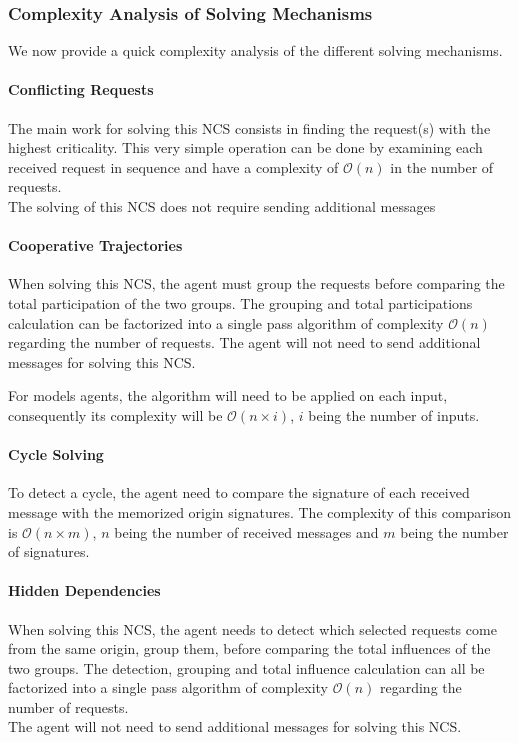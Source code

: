 \subsubsection*{Complexity Analysis of Solving Mechanisms}

We now provide a quick complexity analysis of the different solving mechanisms.

\paragraph*{Conflicting Requests}

The main work for solving this NCS consists in finding the request(s) with the highest criticality. This very simple operation can be done by examining each received request in sequence and have a complexity of $\mathcal{O}(n)$ in the number of requests.\\
The solving of this NCS does not require sending additional messages

\paragraph*{Cooperative Trajectories }

When solving this NCS, the agent must group the requests before comparing the total participation of the two groups. The grouping and total participations calculation can be factorized into a single pass algorithm of complexity $\mathcal{O}(n)$ regarding the number of requests.
The agent will not need to send additional messages for solving this NCS.

For models agents, the algorithm will need to be applied on each input, consequently its complexity will be $\mathcal{O}(n \times i)$, $i$ being the number of inputs.

\paragraph*{Cycle Solving}

To detect a cycle, the agent need to compare the signature of each received message with the memorized origin signatures. The complexity of this comparison is $\mathcal{O}(n \times m)$, $n$ being the number of received messages and $m$ being the number of signatures.

\paragraph*{Hidden Dependencies}
When solving this NCS, the agent needs to detect which selected requests come from the same origin, group them, before comparing the total influences of the two groups. The detection, grouping and total influence calculation can all be factorized into a single pass algorithm of complexity $\mathcal{O}(n)$ regarding the number of requests.\\
The agent will not need to send additional messages for solving this NCS.

